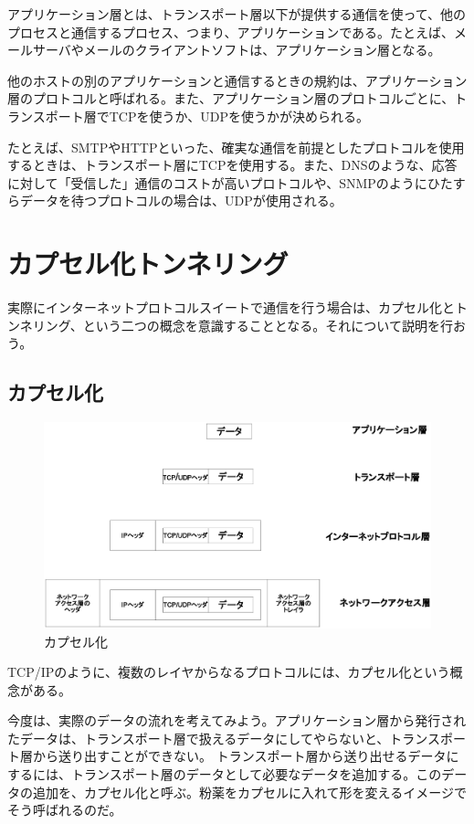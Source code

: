 アプリケーション層とは、トランスポート層以下が提供する通信を使って、他のプロセスと通信するプロセス、つまり、アプリケーションである。たとえば、メールサーバやメールのクライアントソフトは、アプリケーション層となる。

他のホストの別のアプリケーションと通信するときの規約は、アプリケーション層のプロトコルと呼ばれる。また、アプリケーション層のプロトコルごとに、トランスポート層でTCPを使うか、UDPを使うかが決められる。

たとえば、SMTPやHTTPといった、確実な通信を前提としたプロトコルを使用するときは、トランスポート層にTCPを使用する。また、DNSのような、応答に対して「受信した」通信のコストが高いプロトコルや、SNMPのようにひたすらデータを待つプロトコルの場合は、UDPが使用される。



\section{カプセル化トンネリング}

実際にインターネットプロトコルスイートで通信を行う場合は、カプセル化とトンネリング、という二つの概念を意識することとなる。それについて説明を行おう。

\subsection{カプセル化}

\begin{figure}
	\includegraphics[width=12cm,clip]{draw/encupselation.eps}
	\caption{カプセル化}
	\label{fig:encupselation}
\end{figure}

TCP/IPのように、複数のレイヤからなるプロトコルには、カプセル化という概念がある。

今度は、実際のデータの流れを考えてみよう。アプリケーション層から発行されたデータは、トランスポート層で扱えるデータにしてやらないと、トランスポート層から送り出すことができない。
トランスポート層から送り出せるデータにするには、トランスポート層のデータとして必要なデータを追加する。このデータの追加を、カプセル化と呼ぶ。粉薬をカプセルに入れて形を変えるイメージでそう呼ばれるのだ。

